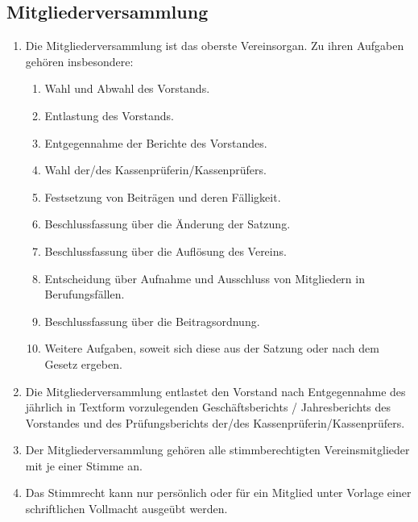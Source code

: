 \documentclass[12pt,a4paper,draft]{article}
\begin{document}
\subsection{Mitgliederversammlung} %
\begin{enumerate}
\item Die Mitgliederversammlung ist das oberste Vereinsorgan. Zu ihren Aufgaben 
gehören insbesondere:

\begin{enumerate}
\item Wahl und Abwahl des Vorstands. %

\item Entlastung des Vorstands.

\item Entgegennahme der Berichte des Vorstandes.

\item Wahl der/des Kassenprüferin/Kassenprüfers.

\item Festsetzung von Beiträgen und deren Fälligkeit.

\item Beschlussfassung über die Änderung der Satzung.

\item Beschlussfassung über die Auflösung des Vereins.

\item Entscheidung über Aufnahme und Ausschluss von Mitgliedern in 
Berufungsfällen.

\item Beschlussfassung über die Beitragsordnung.

\item Weitere Aufgaben, soweit sich diese aus der Satzung oder nach dem Gesetz 
ergeben.
\end{enumerate}

\item Die Mitgliederversammlung entlastet den Vorstand nach Entgegennahme des 
jährlich in Textform vorzulegenden Geschäftsberichts / Jahresberichts des 
Vorstandes und des Prüfungsberichts der/des Kassenprüferin/Kassenprüfers.

\item Der Mitgliederversammlung gehören alle stimmberechtigten 
Vereinsmitglieder mit je einer Stimme an.

\item Das Stimmrecht kann nur persönlich oder für ein Mitglied unter Vorlage 
einer schriftlichen Vollmacht ausgeübt werden.


\end{enumerate}
\end{document}
